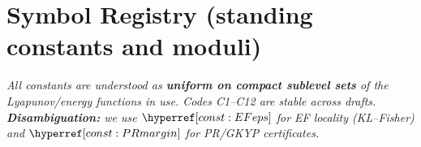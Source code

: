 

\setcounter{tocdepth}{2}
\tableofcontents
\bigskip

\section*{Symbol Registry (standing constants and moduli)}
\noindent\emph{All constants are understood as \textbf{uniform on compact sublevel sets} of the Lyapunov/energy functions in use. Codes C1--C12 are stable across drafts. \textbf{Disambiguation:} we use $\constref{EFeps}$ for EF locality (KL--Fisher) and $\constref{PRmargin}$ for PR/GKYP certificates.}

